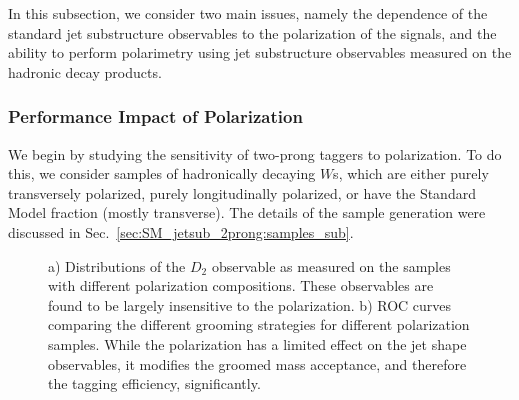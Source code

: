 In this subsection, we consider two main issues, namely
the dependence of the standard jet substructure observables to the
polarization of the signals, and the ability to perform polarimetry
using jet substructure observables measured on the hadronic decay
products.

\subsubsection{Performance Impact of Polarization}\label{sec:SM_jetsub_2prong:polar_robust}


We begin by studying the sensitivity of two-prong taggers to polarization.
%
To do this, we consider samples of hadronically decaying $W$s, which are either purely transversely polarized, purely longitudinally polarized, or have the Standard Model fraction (mostly transverse).
%
The details of the sample generation were discussed in Sec.~\ref{sec:SM_jetsub_2prong:samples_sub}.


\begin{figure}
\begin{center}
\end{center}
\caption{a) Distributions of the $D_2$ observable as measured on the samples with different polarization compositions. These observables are found to be largely insensitive to the polarization. b) ROC curves comparing the different grooming strategies for different polarization samples. While the polarization has a limited effect on the jet shape observables, it modifies the groomed mass acceptance, and therefore the tagging efficiency, significantly.}
\end{figure}


